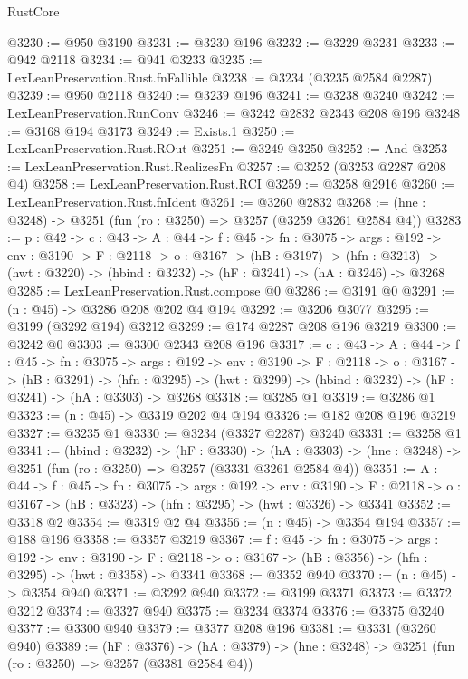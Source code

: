 \begin{lexlean}{RustCore}
\begin{coremodule}
@3230 := @950 @3190
@3231 := @3230 @196
@3232 := @3229 @3231
@3233 := @942 @2118
@3234 := @941 @3233
@3235 := LexLeanPreservation.Rust.fnFallible
@3238 := @3234 (@3235 @2584 @2287)
@3239 := @950 @2118
@3240 := @3239 @196
@3241 := @3238 @3240
@3242 := LexLeanPreservation.RunConv
@3246 := @3242 @2832 @2343 @208 @196
@3248 := @3168 @194 @3173
@3249 := Exists.{1}
@3250 := LexLeanPreservation.Rust.ROut
@3251 := @3249 @3250
@3252 := And
@3253 := LexLeanPreservation.Rust.RealizesFn
@3257 := @3252 (@3253 @2287 @208 @4)
@3258 := LexLeanPreservation.Rust.RCI
@3259 := @3258 @2916
@3260 := LexLeanPreservation.Rust.fnIdent
@3261 := @3260 @2832
@3268 := (hne : @3248) -> @3251 (fun (ro : @3250) => @3257 (@3259 @3261 @2584 @4))
@3283 := {p : @42} ->
  {c : @43} ->
  {A : @44} ->
  {f : @45} ->
  {fn : @3075} ->
  {args : @192} ->
  {env : @3190} ->
  {F : @2118} ->
  {o : @3167} ->
  (hB : @3197) ->
  (hfn : @3213) -> (hwt : @3220) -> (hbind : @3232) -> (hF : @3241) -> (hA : @3246) -> @3268
@3285 := LexLeanPreservation.Rust.compose @0
@3286 := @3191 @0
@3291 := (n : @45) -> @3286 @208 @202 @4 @194
@3292 := @3206 @3077
@3295 := @3199 (@3292 @194) @3212
@3299 := @174 @2287 @208 @196 @3219
@3300 := @3242 @0
@3303 := @3300 @2343 @208 @196
@3317 := {c : @43} ->
  {A : @44} ->
  {f : @45} ->
  {fn : @3075} ->
  {args : @192} ->
  {env : @3190} ->
  {F : @2118} ->
  {o : @3167} ->
  (hB : @3291) ->
  (hfn : @3295) -> (hwt : @3299) -> (hbind : @3232) -> (hF : @3241) -> (hA : @3303) -> @3268
@3318 := @3285 @1
@3319 := @3286 @1
@3323 := (n : @45) -> @3319 @202 @4 @194
@3326 := @182 @208 @196 @3219
@3327 := @3235 @1
@3330 := @3234 (@3327 @2287) @3240
@3331 := @3258 @1
@3341 := (hbind : @3232) ->
  (hF : @3330) ->
  (hA : @3303) -> (hne : @3248) -> @3251 (fun (ro : @3250) => @3257 (@3331 @3261 @2584 @4))
@3351 := {A : @44} ->
  {f : @45} ->
  {fn : @3075} ->
  {args : @192} ->
  {env : @3190} ->
  {F : @2118} -> {o : @3167} -> (hB : @3323) -> (hfn : @3295) -> (hwt : @3326) -> @3341
@3352 := @3318 @2
@3354 := @3319 @2 @4
@3356 := (n : @45) -> @3354 @194
@3357 := @188 @196
@3358 := @3357 @3219
@3367 := {f : @45} ->
  {fn : @3075} ->
  {args : @192} ->
  {env : @3190} ->
  {F : @2118} -> {o : @3167} -> (hB : @3356) -> (hfn : @3295) -> (hwt : @3358) -> @3341
@3368 := @3352 @940
@3370 := (n : @45) -> @3354 @940
@3371 := @3292 @940
@3372 := @3199 @3371
@3373 := @3372 @3212
@3374 := @3327 @940
@3375 := @3234 @3374
@3376 := @3375 @3240
@3377 := @3300 @940
@3379 := @3377 @208 @196
@3381 := @3331 (@3260 @940)
@3389 := (hF : @3376) ->
  (hA : @3379) -> (hne : @3248) -> @3251 (fun (ro : @3250) => @3257 (@3381 @2584 @4))

\end{coremodule}
\end{lexlean}

